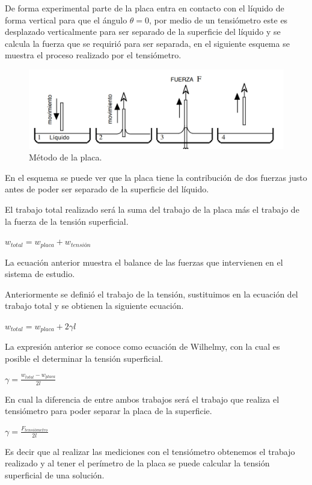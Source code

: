 \documentclass[10pt]{report}
\newcommand{\ec}[1]{\begin{center} $#1$ \end{center}}
\begin{document}
    De forma experimental parte de la placa entra en contacto con el líquido de forma vertical para que el ángulo $\theta=0$, por medio de un tensiómetro este es desplazado verticalmente para ser separado de la superficie del líquido y se calcula la fuerza que se requirió para ser separada, en el siguiente esquema se muestra el proceso realizado por el tensiómetro.

    \begin{figure}[h]
        \centering
        \includegraphics[scale=0.5]{./placaProcedimiento.jpg}
        \caption{Método de la placa.}
    \end{figure}

    En el esquema se puede ver que la placa tiene la contribución de dos fuerzas justo antes de poder ser separado de la superficie del líquido.

    El trabajo total realizado será la suma del trabajo de la placa más el trabajo de la fuerza de la tensión superficial.

    \ec{w_{total} = w_{placa}+w_{tensión}}

    La ecuación anterior muestra el balance de las fuerzas que intervienen en el sistema de estudio.
    
    Anteriormente se definió el trabajo de la tensión, sustituimos en la ecuación del trabajo total y se obtienen la siguiente ecuación.

    \ec{w_{total} = w_{placa}+2\gamma l}

    La expresión anterior se conoce como ecuación de Wilhelmy, con la cual es posible el determinar la tensión superficial.

    \ec{\gamma = \frac{w_{total}-w_{placa}}{2l}}

    En cual la diferencia de entre ambos trabajos será el trabajo que realiza el tensiómetro para poder separar la placa de la superficie.

    \ec{\gamma = \frac{F_{tensiómetro}}{2l}}

    Es decir que al realizar las mediciones con el tensiómetro obtenemos el trabajo realizado y al tener el perímetro de la placa se puede calcular la tensión superficial de una solución.
\end{document}
